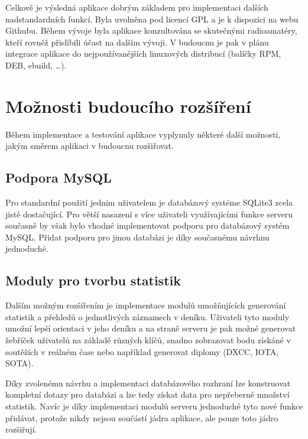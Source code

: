Celkově je výsledná aplikace dobrým základem pro implementaci dalších nadstandardních funkcí. Byla uvolněna pod licencí
GPL a je k dispozici na webu Githubu. Během vývoje byla aplikace konzultována se skutečnými radioamatéry, kteří rovněž
přislíbili účast na dalším vývoji. V budoucnu je pak v plánu integrace aplikace
do nejpoužívanějších linuxových distribucí (balíčky RPM, DEB, ebuild, \ldots).


\section{Možnosti budoucího rozšíření}

Během implementace a testování aplikace vyplynuly některé další možnosti, jakým směrem aplikaci v budoucnu rozšiřovat.

\subsection{Podpora MySQL}

Pro standardní použití jedním uživatelem je databázový systéme SQLite3 zcela jistě dostačující.
Pro větší nasazení s více uživateli využívajícími funkce serveru současně by však bylo vhodné implementovat podporu pro databázový
systém MySQL. Přidat podporu pro jinou databázi je díky současnému návrhnu jednoduché.

\subsection{Moduly pro tvorbu statistik}

Dalším možným rozšířením je implementace modulů umožňujících generování statistik a přehledů o jednotlivých záznamech v deníku.
Uživateli tyto moduly umožní lepší orientaci v jeho deníku a na straně serveru je pak možné generovat žebříček uživatelů na
základě různých klíčů, snadno zobrazovat bodu získáné v soutěžích v reálném čase nebo například generovat diplomy
(DXCC, IOTA, SOTA).

Díky zvolenému návrhu a implementaci databázového rozhraní lze konstruovat kompletní dotazy pro databázi a lze tedy získat
data pro nepřeberné množství statistik. Navíc je díky implementaci modulů serveru jednoduché tyto nové funkce přidávat,
protože nikdy nejsou součástí jádra aplikace, ale pouze toto jádro rozšiřují.


